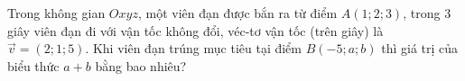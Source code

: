 \begin{ex}%
	Trong không gian $Oxyz$, một viên đạn được bắn ra từ điểm $A(1; 2; 3)$, trong $3\,$giây viên đạn đi với vận tốc không đổi, véc-tơ vận tốc (trên giây) là $\vec{v} = (2; 1; 5)$. Khi viên đạn trúng mục tiêu tại điểm $B(-5; a; b)$ thì giá trị của biểu thức $a + b$ bằng bao nhiêu?
\end{ex}

